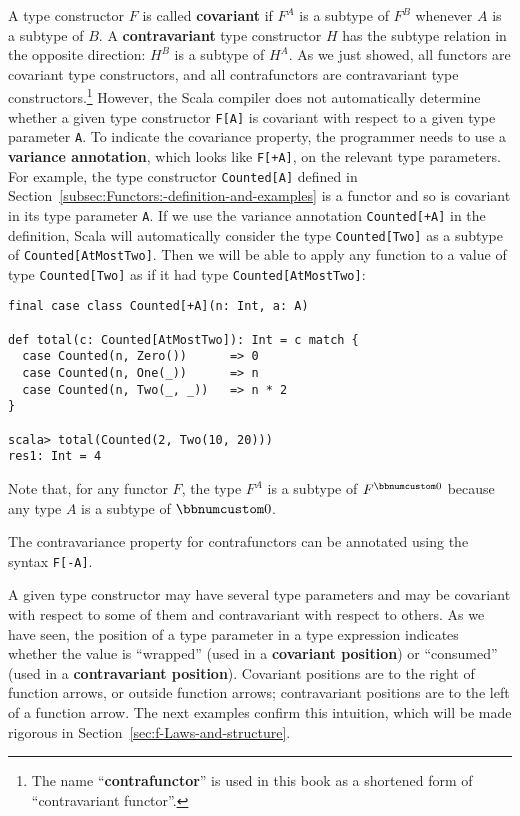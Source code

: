 A type constructor $F$ is called \textbf{covariant}
if $F^{A}$ is a subtype of $F^{B}$ whenever $A$ is a subtype of
$B$. A \textbf{contravariant}
type constructor $H$ has the subtype relation in the opposite direction:
$H^{B}$ is a subtype of $H^{A}$. As we just showed, all functors
are covariant type constructors, and all contrafunctors are contravariant
type constructors.\footnote{The name \textsf{``}\textbf{contrafunctor}\textsf{''} is used
in this book as a shortened form of \textsf{``}contravariant
functor\textsf{''}.} However, the Scala compiler does not automatically determine whether
a given type constructor \lstinline!F[A]! is covariant with respect
to a given type parameter \lstinline!A!. To indicate the covariance
property, the programmer needs to use a \textbf{variance
annotation}, which looks like \lstinline!F[+A]!, on the relevant
type parameters. For example, the type constructor \lstinline!Counted[A]!
defined in Section~\ref{subsec:Functors:-definition-and-examples}
is a functor and so is covariant in its type parameter \lstinline!A!.
If we use the variance annotation \lstinline!Counted[+A]! in the
definition, Scala will automatically consider the type \lstinline!Counted[Two]!
as a subtype of \lstinline!Counted[AtMostTwo]!. Then we will be able
to apply any function to a value of type \lstinline!Counted[Two]!
as if it had type \lstinline!Counted[AtMostTwo]!:
\begin{lstlisting}
final case class Counted[+A](n: Int, a: A)

def total(c: Counted[AtMostTwo]): Int = c match {
  case Counted(n, Zero())      => 0
  case Counted(n, One(_))      => n
  case Counted(n, Two(_, _))   => n * 2
}

scala> total(Counted(2, Two(10, 20)))
res1: Int = 4
\end{lstlisting}

Note that, for any functor $F$, the type $F^{A}$ is a subtype of
$F^{\bbnum 0}$ because any type $A$ is a subtype of $\bbnum 0$.

The contravariance property for contrafunctors can be annotated using
the syntax \lstinline!F[-A]!.

A given type constructor may have several type parameters and may
be covariant with respect to some of them and contravariant with respect
to others. As we have seen, the position of a type parameter in a
type expression indicates whether the value is \textsf{``}wrapped\textsf{''} (used
in a \textbf{covariant position}) or \textsf{``}consumed\textsf{''}
(used in a \textbf{contravariant position}).
Covariant positions are to the right of function arrows, or outside
function arrows; contravariant positions are to the left of a function
arrow. The next examples confirm this intuition, which will be made
rigorous in Section~\ref{sec:f-Laws-and-structure}.

